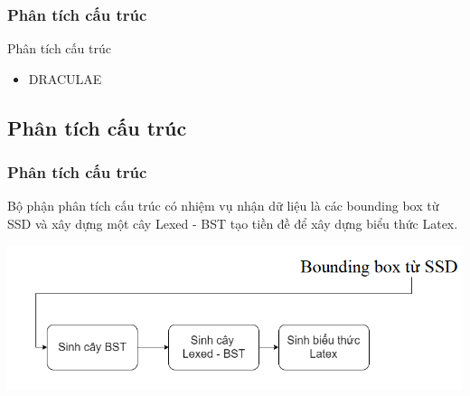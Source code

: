 \documentclass{beamer}
\begin{document}
	
	
	\begin{frame}
		\frametitle{Phân tích cấu trúc}
		{\Huge Phân tích cấu trúc}\\
		\begin{itemize}
			\item DRACULAE
		\end{itemize}
		
	\end{frame}
	
	\subsection{Phân tích cấu trúc}
	\begin{frame}
		\frametitle{Phân tích cấu trúc}
		Bộ phận phân tích cấu trúc có nhiệm vụ nhận dữ liệu là các bounding box từ SSD và xây dựng một cây Lexed - BST tạo tiền đề để xây dựng biểu thức Latex.
	
		\begin{center}
			\centering
			\includegraphics[width=0.95\linewidth]{pipeline3.png}
			\vspace{0.5cm}
		\end{center}

	\end{frame}
	
\end{document}
